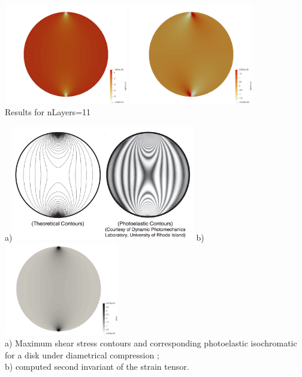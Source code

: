 \begin{center}
\includegraphics[width=5.4cm]{python_codes/fieldstone_58/experiment1/111/sigma_yy}
\includegraphics[width=5.4cm]{python_codes/fieldstone_58/experiment1/111/sigma_xy}\\
{\captionfont Results for nLayers=11}
\end{center}

\newpage

\begin{center}
a)\includegraphics[width=8cm]{python_codes/fieldstone_58/experiment1/contours}
b)\includegraphics[width=5cm]{python_codes/fieldstone_58/experiment1/111/e_2}\\
{\captionfont 
a) Maximum shear stress contours and corresponding photoelastic isochromatic 
for a disk under diametrical compression \cite{sadd14};\\
b) computed second invariant of the strain tensor.}
\end{center}


